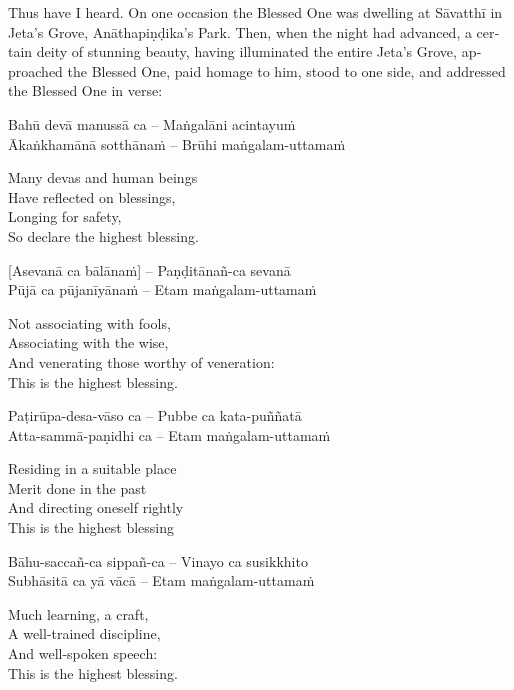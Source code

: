\begin{english}
  Thus have I heard. On one occasion the Blessed One was dwelling at Sāvatthī in Jeta's Grove, Anāthapiṇḍika's Park. Then, when the night had advanced, a certain deity of stunning beauty, having illuminated the entire Jeta's Grove, approached the Blessed One, paid homage to him, stood to one side, and addressed the Blessed One in verse:
\end{english}

Bahū devā manussā ca – Maṅgalāni acintayuṁ\\
Ākaṅkhamānā sotthānaṁ – Brūhi maṅgalam-uttamaṁ

\begin{english}
  Many devas and human beings\\
  Have reflected on blessings,\\
  Longing for safety,\\
  So declare the highest blessing.
\end{english}

[Asevanā ca bālānaṁ] – Paṇḍitānañ-ca sevanā\\
Pūjā ca pūjanīyānaṁ – Etam maṅgalam-uttamaṁ

\begin{english}
  Not associating with fools,\\
  Associating with the wise,\\
  And venerating those worthy of veneration:\\
  This is the highest blessing.
\end{english}

Paṭirūpa-desa-vāso ca – Pubbe ca kata-puññatā\\
Atta-sammā-paṇidhi ca – Etam maṅgalam-uttamaṁ

\begin{english}
  Residing in a suitable place\\
  Merit done in the past\\
  And directing oneself rightly\\
  This is the highest blessing
\end{english}

Bāhu-saccañ-ca sippañ-ca – Vinayo ca susikkhito\\
Subhāsitā ca yā vācā – Etam maṅgalam-uttamaṁ

\begin{english}
  Much learning, a craft,\\
  A well-trained discipline,\\
  And well-spoken speech:\\
  This is the highest blessing.
\end{english}

